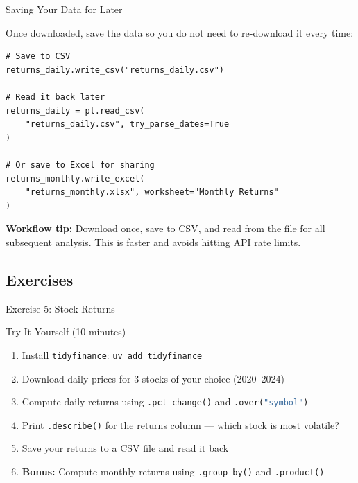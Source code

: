 \documentclass[9pt,aspectratio=169]{beamer}
\newcommand{\py}[1]{\lstinline[language=Python]{#1}}
\begin{document}
\begin{frame}[fragile]{Saving Your Data for Later}

Once downloaded, save the data so you do not need to re-download it every time:

\begin{lstlisting}
# Save to CSV
returns_daily.write_csv("returns_daily.csv")

# Read it back later
returns_daily = pl.read_csv(
    "returns_daily.csv", try_parse_dates=True
)

# Or save to Excel for sharing
returns_monthly.write_excel(
    "returns_monthly.xlsx", worksheet="Monthly Returns"
)
\end{lstlisting}

\medskip

\begin{highlightbox}
\centering
\textbf{Workflow tip:} Download once, save to CSV, and read from the file for all subsequent analysis. This is faster and avoids hitting API rate limits.
\end{highlightbox}

\end{frame}


\subsection{Exercises}
\begin{frame}[fragile]{Exercise 5: Stock Returns}

\begin{alertblock}{Try It Yourself (10 minutes)}
\begin{enumerate}
    \item Install \texttt{tidyfinance}: \texttt{uv add tidyfinance}
    \item Download daily prices for 3 stocks of your choice (2020--2024)
    \item Compute daily returns using \py{.pct_change()} and \py{.over("symbol")}
    \item Print \py{.describe()} for the returns column --- which stock is most volatile?
    \item Save your returns to a CSV file and read it back
    \item \textbf{Bonus:} Compute monthly returns using \py{.group_by()} and \py{.product()}
\end{enumerate}
\end{alertblock}

\end{frame}
\end{document}
